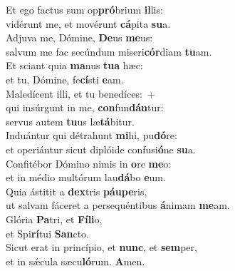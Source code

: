 \evenverse Et ego factus sum op\textbf{pró}brium \textbf{il}lis:~\*\\
\evenverse vidérunt me, et movérunt \textbf{cá}pita \textbf{su}a.\\
\oddverse Adjuva me, Dómine, \textbf{De}us \textbf{me}us:~\*\\
\oddverse salvum me fac secúndum miseri\textbf{cór}diam \textbf{tu}am.\\
\evenverse Et sciant quia \textbf{ma}nus \textbf{tu}\textbf{a} hæc:~\*\\
\evenverse et tu, Dómine, fe\textbf{cí}sti \textbf{e}am.\\
\oddverse Maledícent illi, et tu benedíces:~+\\
\oddverse  qui insúrgunt in me, \textbf{con}fun\textbf{dán}tur:~\*\\
\oddverse servus autem \textbf{tu}us læ\textbf{tá}bitur.\\
\evenverse Induántur qui détrahunt \textbf{mi}hi, pu\textbf{dó}re:~\*\\
\evenverse et operiántur sicut diplóide confusi\textbf{ó}ne \textbf{su}a.\\
\oddverse Confitébor Dómino nimis in \textbf{o}re \textbf{me}o:~\*\\
\oddverse et in médio multórum lau\textbf{dá}bo \textbf{e}um.\\
\evenverse Quia ástitit a \textbf{dex}tris \textbf{páu}\textbf{pe}ris,~\*\\
\evenverse ut salvam fáceret a persequéntibus \textbf{á}nimam \textbf{me}am.\\
\oddverse Glória \textbf{Pa}tri, et \textbf{Fí}\textbf{li}o,~\*\\
\oddverse et Spi\textbf{rí}tui \textbf{San}cto.\\
\evenverse Sicut erat in princípio, et \textbf{nunc}, et \textbf{sem}per,~\*\\
\evenverse et in sǽcula sæcu\textbf{ló}rum. \textbf{A}men.\\
